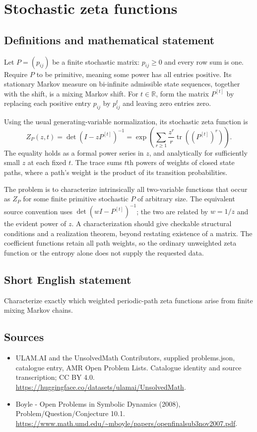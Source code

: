\documentclass[11pt,a4paper]{article}
\begin{document}
\section*{Stochastic zeta functions}\label{statement}

\subsection{Definitions and mathematical statement}
Let $P=(p_{ij})$ be a finite stochastic matrix: $p_{ij}\ge0$ and every
row sum is one. Require $P$ to be primitive, meaning some power has all
entries positive. Its stationary Markov measure on bi-infinite admissible
state sequences, together with the shift, is a mixing Markov shift.
For $t\in\mathbb R$, form the matrix $P^{[t]}$ by replacing each positive
entry $p_{ij}$ by $p_{ij}^t$ and leaving zero entries zero.

Using the usual generating-variable normalization, its stochastic zeta
function is
\[
 Z_P(z,t)=\det(I-zP^{[t]})^{-1}
 =\exp\!\left(\sum_{r\ge1}\frac{z^r}{r}
                              \operatorname{tr}((P^{[t]})^r)\right).
\]
The equality holds as a formal power series in $z$, and analytically
for sufficiently small $z$ at each fixed $t$. The trace sums $t$th powers
of weights of closed state paths, where a path's weight is the product
of its transition probabilities.

The problem is to characterize intrinsically all two-variable functions
that occur as $Z_P$ for some finite primitive stochastic $P$ of arbitrary
size. The equivalent source convention uses $\det(wI-P^{[t]})^{-1}$;
the two are related by $w=1/z$ and the evident power of $z$.
A characterization should give checkable structural conditions and a
realization theorem, beyond restating existence of a matrix. The
coefficient functions retain all path weights, so the ordinary unweighted
zeta function or the entropy alone does not supply the requested data.
\subsection{Short English statement}
Characterize exactly which weighted periodic-path zeta functions arise from finite mixing Markov chains.
\subsection{Sources}
\begin{itemize}
\item[S1] ULAM.AI and the UnsolvedMath Contributors, supplied problems.json, catalogue entry, AMR Open Problem Lists. Catalogue identity and source transcription; CC BY 4.0.
\url{https://huggingface.co/datasets/ulamai/UnsolvedMath}.
\item[S2] Boyle - Open Problems in Symbolic Dynamics (2008), Problem/Question/Conjecture 10.1. 
\url{https://www.math.umd.edu/~mboyle/papers/openfinalsub3nov2007.pdf}.
\end{itemize}
\end{document}
